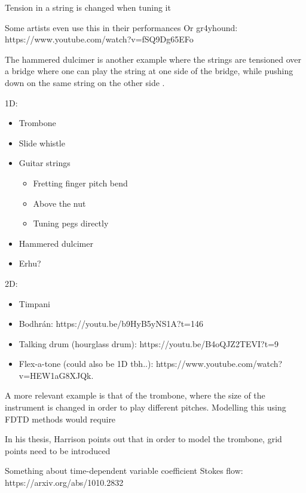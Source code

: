 Tension in a string is changed when tuning it

Some artists even use this in their performances \cite{Gomm2011, Mayer2008}
Or gr4yhound: https://www.youtube.com/watch?v=fSQ9Dg65EFo

The hammered dulcimer is another example where the strings are tensioned over a bridge where one can play the string at one side of the bridge, while pushing down on the same string on the other side \cite{Glenn2014}.

\noindent 1D:
\begin{itemize}
    \item Trombone
    \item Slide whistle
    \item Guitar strings
    \begin{itemize}
        \item Fretting finger pitch bend
        \item Above the nut \cite{Mayer2008}
        \item Tuning pegs directly \cite{Gomm2011}
    \end{itemize}
    \item Hammered dulcimer \cite{Glenn2014}
    \item Erhu? 
\end{itemize}
%
2D: 
\begin{itemize}
    \item Timpani
    \item Bodhr\'an: https://youtu.be/b9HyB5yNS1A?t=146
    \item Talking drum (hourglass drum): https://youtu.be/B4oQJZ2TEVI?t=9
    \item Flex-a-tone (could also be 1D tbh..): https://www.youtube.com/watch?v=HEW1aG8XJQk.
\end{itemize}

A more relevant example is that of the trombone, where the size of the instrument is changed in order to play different pitches. Modelling this using FDTD methods would require



In his thesis, Harrison points out that in order to model the trombone, grid points need to be introduced 


Something about time-dependent variable coefficient Stokes flow:
https://arxiv.org/abs/1010.2832

